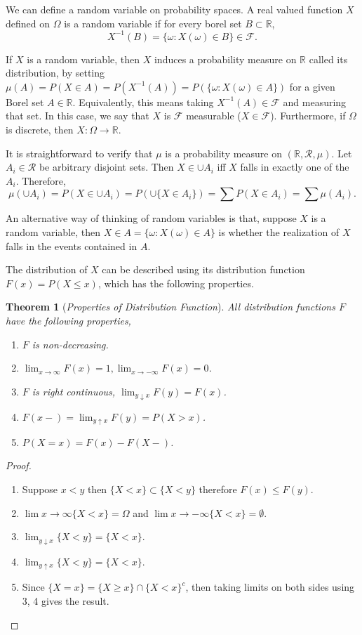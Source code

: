 \documentclass[10pt,a4paper]{article}
\newtheorem{theorem}{Theorem}[section]
\numberwithin{equation}{subsection}
\begin{document}
We can define a random variable on probability spaces. 
A real valued function $X$ defined on $\Omega$ is a random variable
if for every borel set $B \subset \mathbb{R}$,
\[
	X^{-1}(B) = \{\omega:X(\omega) \in B\} \in \mathcal{F}.
\]

If $X$ is a random variable, then $X$ induces a probability
measure on $\mathbb{R}$ called its distribution, by
setting $\mu(A) = P(X\in A) = P(X^{-1}(A)) =
P(\{\omega:X(\omega) \in A\})$ for a given Borel set $A \in 
\mathbb{R}$. Equivalently, this means taking $X^{-1}(A) \in \mathcal{F}$ and measuring that set. 
In this case, we say that $X$ is $\mathcal{F}$ measurable ($X \in \mathcal{F}$). 
Furthermore, if $\Omega$ is discrete, then $X:\Omega \rightarrow \mathbb{R}$. 

It is straightforward to verify that $\mu$ is a probability measure on
$(\mathbb{R}, \mathcal{R}, \mu)$. 
Let $A_i \in \mathcal{R}$ be arbitrary disjoint sets. Then $X \in \cup A_i$ iff
$X$ falls in exactly one of the $A_i$. Therefore,
\[
	\mu(\cup A_i) = P(X \in \cup A_i) = P(\cup\{X \in A_i\}) = \sum P(X \in A_i) = \sum \mu(A_i). 
\]

An alternative way of thinking of random variables is that, 
suppose $X$ is a random variable, then $X\in A = \{\omega: X(\omega) \in A\}$ is whether the realization of $X$ falls in the events contained in $A$.

The distribution of $X$ can be described using its
distribution function $F(x) = P(X \leq x)$, which
has the following properties.

\begin{theorem}[\emph{Properties of Distribution Function}]
\label{1.prop.distr}
	All distribution functions $F$ have the following properties,
	\begin{enumerate}
		\item $F$ is non-decreasing.
		\item $\lim_{x\rightarrow\infty} F(x) = 1, \lim_{x \rightarrow - \infty} F(x) = 0$. 
		\item $F$ is right continuous, $\lim_{y\downarrow  x} F(y) = F(x)$.
		\item $F(x-) = \lim_{y \uparrow x} F(y) = P(X>x)$.
		\item $P(X=x) = F(x) - F(X-)$. 
	\end{enumerate}
\end{theorem} 

\begin{proof}
\begin{enumerate}
	\item Suppose $x < y$ then $\{X < x\} \subset \{X < y\}$
	therefore $F(x) \leq F(y)$. 
	\item $\lim {x\rightarrow\infty} \{X < x\} = \Omega$ 
	and $\lim {x\rightarrow-\infty} \{X < x\} = \emptyset$.
	\item  $\lim_{y\downarrow  x} \{X < y\} = \{X < x\}$. 
	\item  $\lim_{y\uparrow  x} \{X < y\} = \{X < x\}$.
	\item Since $\{X = x\} = \{X \geq x\} \cap \{X < x\}^c$,
	then taking limits on both sides using 3, 4 gives the 
	result.  
\end{enumerate}
\end{proof}
\end{document}
